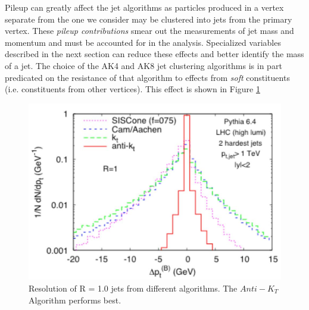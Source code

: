 Pileup can greatly affect the jet algorithms as particles produced in a vertex separate from the one we consider may be clustered into jets from the primary vertex. These \textit{pileup contributions} smear out the measurements of jet mass and momentum and must be accounted for in the analysis. Specialized variables described in the next section can reduce these effects and better identify the mass of a jet. The choice of the AK4 and AK8 jet clustering algorithms is in part predicated on the resistance of that algorithm to effects from \textit{soft} constituents (i.e. constituents from other vertices). This effect is shown in Figure \ref{Fig:CMS:NoPU}
\begin{figure}[h!]
    \centering
        \includegraphics[width=\textwidth]{F3/NoPU}
        \caption{Resolution of R = 1.0 jets from different algorithms. The $Anti-K_T$ Algorithm performs best.}
        \label{Fig:CMS:NoPU}
\end{figure}